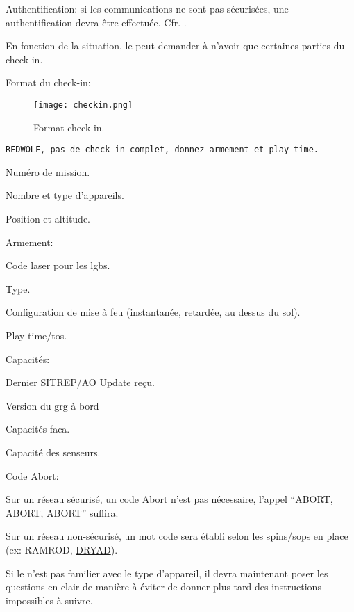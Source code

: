 \begin{e1}
	\item Authentification: si les communications ne sont pas sécurisées, une authentification devra être effectuée. Cfr. .
	
	\item En fonction de la situation, le \ja{} peut demander à n'avoir que certaines parties du check-in.
	
	\begin{minipage}{\linewidth}
		\item Format du check-in:
		\begin{figure}[H]
			\texttt{[image: checkin.png]}
			\caption{Format check-in.}
			\label{fig:checkin}
		\end{figure}	
	\end{minipage}
	
	\begin{minipage}{\linewidth}
		\begin{lstlisting}[caption=Check-in: partiel, label=checkinpart]
	REDWOLF, pas de check-in complet, donnez armement et play-time.
		\end{lstlisting}
	\end{minipage}
	
	\begin{e2}
		\item Numéro de mission.
		\item Nombre et type d'appareils.
		\item Position et altitude.
		\item Armement:
		\begin{e3}
			\item Code laser pour les \glspl{lgb}.
			\item Type.
			\item Configuration de mise à feu (instantanée, retardée, au dessus du sol).
		\end{e3}
		\item Play-time/\gls{tos}.
		\item Capacités:
		\begin{e3}
			\item Dernier SITREP/AO Update reçu.
			\item Version du \gls{grg} à bord
			\item Capacités \gls{faca}.
			\item Capacité des senseurs.
		\end{e3}
		\item Code Abort:
		\begin{e3}
			\item Sur un réseau sécurisé, un code Abort n'est pas nécessaire, l'appel ``ABORT, ABORT, ABORT'' suffira.
			\item Sur un réseau non-sécurisé, un mot code sera établi selon les \gls{spins}/\glspl{sop} en place (ex: RAMROD, \hyperref[dryad]{DRYAD}).
		\end{e3}
		\item Si le \ja{} n'est pas familier avec le type d'appareil, il devra maintenant poser les questions en clair de manière à éviter de donner plus tard des instructions impossibles à suivre.
	\end{e2}
\end{e1}
	

